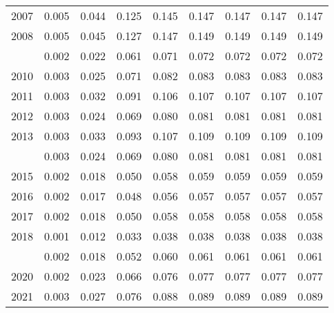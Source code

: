 \documentclass[
]{article}
\begin{document}
\begin{longtable}[t]{lrrrrrrrr}
2007 & 0.005 & 0.044 & 0.125 & 0.145 & 0.147 & 0.147 & 0.147 & 0.147\\
2008 & 0.005 & 0.045 & 0.127 & 0.147 & 0.149 & 0.149 & 0.149 & 0.149\\
\addlinespace
2009 & 0.002 & 0.022 & 0.061 & 0.071 & 0.072 & 0.072 & 0.072 & 0.072\\
2010 & 0.003 & 0.025 & 0.071 & 0.082 & 0.083 & 0.083 & 0.083 & 0.083\\
2011 & 0.003 & 0.032 & 0.091 & 0.106 & 0.107 & 0.107 & 0.107 & 0.107\\
2012 & 0.003 & 0.024 & 0.069 & 0.080 & 0.081 & 0.081 & 0.081 & 0.081\\
2013 & 0.003 & 0.033 & 0.093 & 0.107 & 0.109 & 0.109 & 0.109 & 0.109\\
\addlinespace
2014 & 0.003 & 0.024 & 0.069 & 0.080 & 0.081 & 0.081 & 0.081 & 0.081\\
2015 & 0.002 & 0.018 & 0.050 & 0.058 & 0.059 & 0.059 & 0.059 & 0.059\\
2016 & 0.002 & 0.017 & 0.048 & 0.056 & 0.057 & 0.057 & 0.057 & 0.057\\
2017 & 0.002 & 0.018 & 0.050 & 0.058 & 0.058 & 0.058 & 0.058 & 0.058\\
2018 & 0.001 & 0.012 & 0.033 & 0.038 & 0.038 & 0.038 & 0.038 & 0.038\\
\addlinespace
2019 & 0.002 & 0.018 & 0.052 & 0.060 & 0.061 & 0.061 & 0.061 & 0.061\\
2020 & 0.002 & 0.023 & 0.066 & 0.076 & 0.077 & 0.077 & 0.077 & 0.077\\
2021 & 0.003 & 0.027 & 0.076 & 0.088 & 0.089 & 0.089 & 0.089 & 0.089\\*
\end{longtable}
\end{document}
